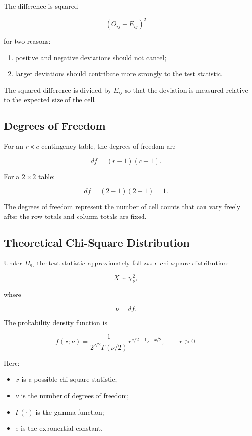 \documentclass[11pt]{article}
\begin{document}
The difference is squared:

\[
(O_{ij}-E_{ij})^2
\]

for two reasons:

\begin{enumerate}[noitemsep]
    \item positive and negative deviations should not cancel;
    \item larger deviations should contribute more strongly to the test
    statistic.
\end{enumerate}

The squared difference is divided by \(E_{ij}\) so that the deviation is
measured relative to the expected size of the cell.

\subsection{Degrees of Freedom}

For an \(r\times c\) contingency table, the degrees of freedom are

\[
\boxed{
df=(r-1)(c-1).
}
\]

For a \(2\times2\) table:

\[
df=(2-1)(2-1)=1.
\]

The degrees of freedom represent the number of cell counts that can vary
freely after the row totals and column totals are fixed.

\subsection{Theoretical Chi-Square Distribution}

Under \(H_0\), the test statistic approximately follows a chi-square
distribution:

\[
X\sim\chi^2_{\nu},
\]

where

\[
\nu=df.
\]

The probability density function is

\[
f(x;\nu)
=
\frac{
1
}{
2^{\nu/2}\Gamma(\nu/2)
}
x^{\nu/2-1}e^{-x/2},
\qquad x>0.
\]

Here:

\begin{itemize}[noitemsep]
    \item \(x\) is a possible chi-square statistic;
    \item \(\nu\) is the number of degrees of freedom;
    \item \(\Gamma(\cdot)\) is the gamma function;
    \item \(e\) is the exponential constant.
\end{itemize}
\end{document}
